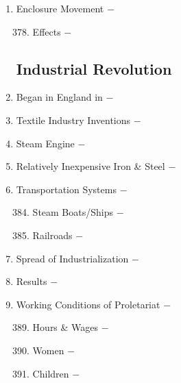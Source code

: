 \documentclass[12pt]{article}
\begin{document}
\begin{enumerate}
\begin{enumerate}[label=\arabic{*}.]
\end{enumerate}
\setcounter{enumi}{376}

\item Enclosure Movement $-$ 

\begin{enumerate}[label=\arabic{*}.]
\setcounter{enumii}{377}

\item Effects $-$ 

\end{enumerate}
\setcounter{enumi}{378}

\subsection{Industrial Revolution}

\item Began in England in $-$ 

\item Textile Industry Inventions $-$ 

\item Steam Engine $-$ 

\item Relatively Inexpensive Iron \& Steel $-$

\item Transportation Systems $-$

\begin{enumerate}[label=\arabic{*}.]
\setcounter{enumii}{383}

\item Steam Boats/Ships $-$

\item Railroads $-$ 


\end{enumerate}
\setcounter{enumi}{385}

\item Spread of Industrialization $-$ 

\item Results $-$ 

\item Working Conditions of Proletariat $-$ 

\begin{enumerate}[label=\arabic{*}.]
\setcounter{enumii}{388}

\item Hours \& Wages $-$

\item Women $-$

\item Children $-$ 



\end{enumerate}
\end{enumerate}
\end{document}
